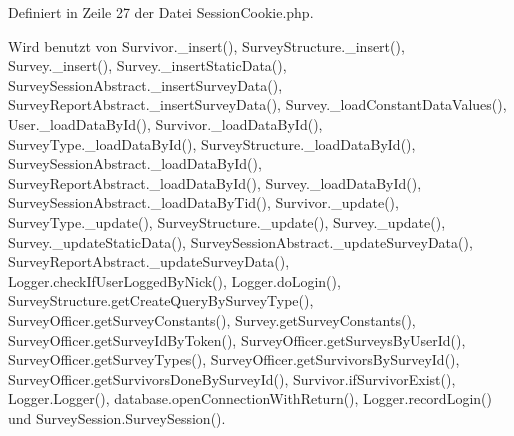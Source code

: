 Definiert in Zeile 27 der Datei SessionCookie.php.

Wird benutzt von Survivor.\_\-insert(), SurveyStructure.\_\-insert(), Survey.\_\-insert(), Survey.\_\-insertStaticData(), SurveySessionAbstract.\_\-insertSurveyData(), SurveyReportAbstract.\_\-insertSurveyData(), Survey.\_\-loadConstantDataValues(), User.\_\-loadDataById(), Survivor.\_\-loadDataById(), SurveyType.\_\-loadDataById(), SurveyStructure.\_\-loadDataById(), SurveySessionAbstract.\_\-loadDataById(), SurveyReportAbstract.\_\-loadDataById(), Survey.\_\-loadDataById(), SurveySessionAbstract.\_\-loadDataByTid(), Survivor.\_\-update(), SurveyType.\_\-update(), SurveyStructure.\_\-update(), Survey.\_\-update(), Survey.\_\-updateStaticData(), SurveySessionAbstract.\_\-updateSurveyData(), SurveyReportAbstract.\_\-updateSurveyData(), Logger.checkIfUserLoggedByNick(), Logger.doLogin(), SurveyStructure.getCreateQueryBySurveyType(), SurveyOfficer.getSurveyConstants(), Survey.getSurveyConstants(), SurveyOfficer.getSurveyIdByToken(), SurveyOfficer.getSurveysByUserId(), SurveyOfficer.getSurveyTypes(), SurveyOfficer.getSurvivorsBySurveyId(), SurveyOfficer.getSurvivorsDoneBySurveyId(), Survivor.ifSurvivorExist(), Logger.Logger(), database.openConnectionWithReturn(), Logger.recordLogin() und SurveySession.SurveySession().